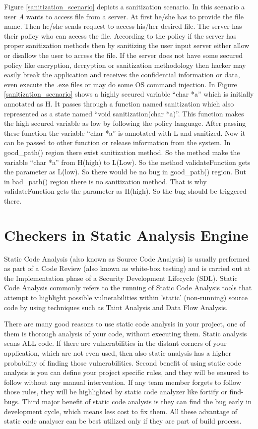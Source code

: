  Figure \ref{sanitization_scenario} depicts a sanitization scenario. In this scenario a user \emph{A} wants to access file from a server. At first he/she has to provide the file name. Then he/she sends request to access his/her desired file. The server has their policy who can access the file. According to the policy if the server has proper sanitization methods then by sanitizing the user input server either allow or disallow the user to access the file. If the server does not have some secured policy like encryption, decryption or sanitization methodology then hacker may easily break the application and receives the confidential information or data, even execute the .exe files or may do some OS command injection. In Figure \ref{sanitization_scenario} shows a highly secured variable \enquote{char *a} which is initially annotated as H. It passes through a function named sanitization which also represented as a state named \enquote{void sanitization(char *a)}. This function makes the high secured variable as low by following the policy language. After passing these function the variable \enquote{char *a} is annotated with L and sanitized. Now it can be passed to other function or release information from the system. In good\_path() region there exist sanitization method. So the method make the variable \enquote{char *a} from H(high) to L(Low). So the method validateFunction gets the parameter as L(low). So there would be no bug in good\_path() region. But in bad\_path() region there is no sanitization method. That is why validateFunction gets the parameter as H(high). So the bug should be triggered there.



\section{Checkers in Static Analysis Engine}

Static Code Analysis (also known as Source Code Analysis) is usually performed as part of a Code Review (also known as white-box testing) and is carried out at the Implementation phase of a Security Development Lifecycle (SDL). Static Code Analysis commonly refers to the running of Static Code Analysis tools that attempt to highlight possible vulnerabilities within 'static' (non-running) source code by using techniques such as Taint Analysis and Data Flow Analysis.

There are many good reasons to use static code analysis in your project, one of them is thorough analysis of your code, without executing them. Static analysis scans ALL code. If there are vulnerabilities in the distant corners of your application, which are not even used, then also static analysis has a higher probability of finding those vulnerabilities. Second benefit of using static code analysis is you can define your project specific rules, and they will be ensured to follow without any manual intervention. If any team member forgets to follow those rules, they will be highlighted by static code analyzer like fortify or find-bugs. Third major benefit of static code analysis is they can find the bug early in development cycle, which means less cost to fix them. All these advantage of static code analyser can be best utilized only if they are part of build process.


